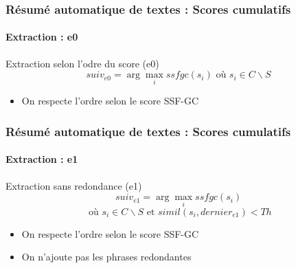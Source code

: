 \documentclass[xcolor=table]{beamer}
\begin{document}
\begin{frame}
\frametitle{Résumé automatique de textes : Scores cumulatifs}
\framesubtitle{Extraction : e0}

\begin{block}{Extraction selon l'odre du score (e0)}
	\[
	suiv_{e0}  =  \arg\max\limits_i ssfgc(s_i) 
	\text{ où } s_i \in C\backslash S
	\]
\end{block}
\begin{itemize}
	\item On respecte l'ordre selon le score SSF-GC
\end{itemize}
%		
%		
	
\end{frame}

\begin{frame}
\frametitle{Résumé automatique de textes : Scores cumulatifs}
\framesubtitle{Extraction : e1}

\begin{block}{Extraction sans redondance (e1)}
	\[suiv_{e1}  =  \arg\max\limits_i ssfgc(s_i)\]
	\[\text{ où } s_i \in C\backslash S \text{ et } simil(s_i, dernier_{e1}) < Th\]
\end{block}
\begin{itemize}
	\item On respecte l'ordre selon le score SSF-GC
	\item On n'ajoute pas les phrases redondantes
\end{itemize}
%		
%		
	
\end{frame}
\end{document}
